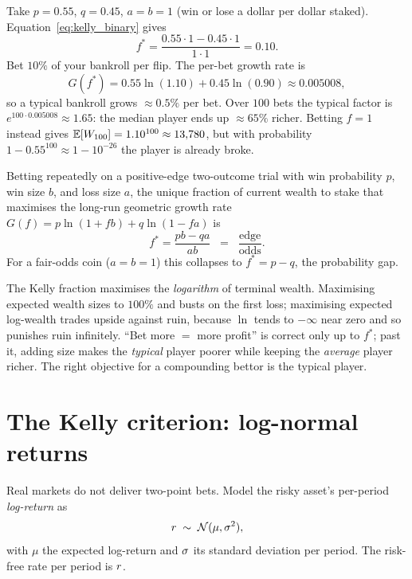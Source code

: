 Take $p = 0.55$, $q = 0.45$, $a = b = 1$ (win or lose a dollar per
dollar staked). Equation~\eqref{eq:kelly_binary} gives
\begin{equation}
  f^{*} = \frac{0.55 \cdot 1 - 0.45 \cdot 1}{1\cdot 1}
  = 0.10.
\end{equation}
Bet $10\%$ of your bankroll per flip. The per-bet growth rate is
\begin{equation}
  G(f^{*}) = 0.55\ln(1.10) + 0.45\ln(0.90)
  \approx 0.005008,
\end{equation}
so a typical bankroll grows $\approx 0.5\%$ per bet. Over $100$
bets the typical factor is $e^{100 \cdot 0.005008} \approx 1.65$:
the median player ends up $\approx 65\%$ richer. Betting $f = 1$
instead gives $\mathbb{E}[W_{100}] = 1.10^{100} \approx 13{,}780$, but
with probability $1 - 0.55^{100} \approx 1 - 10^{-26}$ the player
is already broke.

\begin{keyfactbox}
Betting repeatedly on a positive-edge two-outcome trial with win
probability $p$, win size $b$, and loss size $a$, the unique
fraction of current wealth to stake that maximises the long-run
geometric growth rate $G(f) = p\ln(1+fb) + q\ln(1-fa)$ is
\begin{equation*}
  f^{*} = \frac{pb - qa}{ab}
  \;\; = \;\; \frac{\text{edge}}{\text{odds}}.
\end{equation*}
For a fair-odds coin ($a=b=1$) this collapses to $f^{*} = p - q$,
the probability gap.
\end{keyfactbox}

\begin{intuitionbox}
The Kelly fraction maximises the \emph{logarithm} of terminal
wealth. Maximising expected wealth sizes to $100\%$ and busts on
the first loss; maximising expected log-wealth trades upside
against ruin, because $\ln$ tends to $-\infty$ near zero and so
punishes ruin infinitely. ``Bet more $=$ more profit'' is correct
only up to $f^{*}$; past it, adding size makes the \emph{typical}
player poorer while keeping the \emph{average} player richer. The
right objective for a compounding bettor is the typical player.
\end{intuitionbox}

\section{The Kelly criterion: log-normal returns}
\label{sec:kelly_lognormal}

Real markets do not deliver two-point bets. Model the risky
asset's per-period \emph{log-return} as
\begin{equation}
  r \;\sim\; \mathcal{N}(\mu, \sigma^2),
\end{equation}
with $\mu$ the expected log-return and $\sigma$ its standard
deviation per period. The risk-free rate per period is $r$.

